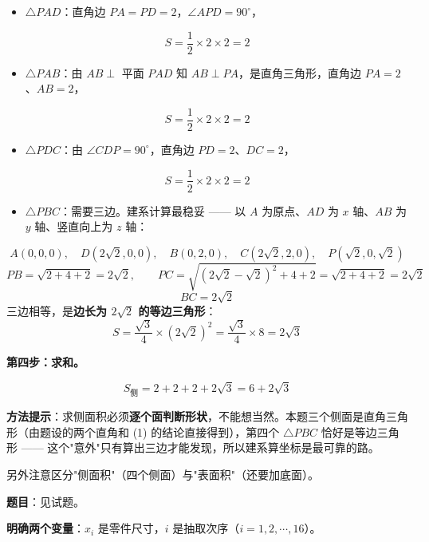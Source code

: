 \begin{itemize}
\item \textbf{$\triangle PAD$}：直角边 $PA=PD=2$，$\angle APD=90^\circ$，
\end{itemize}
\[S=\frac12\times2\times2=2\]
\begin{itemize}
\item \textbf{$\triangle PAB$}：由 $AB\perp$ 平面 $PAD$ 知 $AB\perp PA$，是直角三角形，直角边 $PA=2$、$AB=2$，
\end{itemize}
\[S=\frac12\times2\times2=2\]
\begin{itemize}
\item \textbf{$\triangle PDC$}：由 $\angle CDP=90^\circ$，直角边 $PD=2$、$DC=2$，
\end{itemize}
\[S=\frac12\times2\times2=2\]
\begin{itemize}
\item \textbf{$\triangle PBC$}：需要三边。建系计算最稳妥 —— 以 $A$ 为原点、$AD$ 为 $x$ 轴、$AB$ 为 $y$ 轴、竖直向上为 $z$ 轴：
\end{itemize}
\[A(0,0,0),\quad D\left(2\sqrt2,0,0\right),\quad B(0,2,0),\quad C\left(2\sqrt2,2,0\right),\quad P\left(\sqrt2,0,\sqrt2\right)\]
\[PB=\sqrt{2+4+2}=2\sqrt2,\qquad PC=\sqrt{\left(2\sqrt2-\sqrt2\right)^{2}+4+2}=\sqrt{2+4+2}=2\sqrt2\]
\[BC=2\sqrt2\]
  三边相等，是\textbf{边长为 $2\sqrt2$ 的等边三角形}：
\[S=\frac{\sqrt3}4\times\left(2\sqrt2\right)^{2}=\frac{\sqrt3}4\times8=2\sqrt3\]

\textbf{第四步：求和。}

\[S_{\text{侧}}=2+2+2+2\sqrt3=6+2\sqrt3\]


\begin{gktip}
\textbf{方法提示}：求侧面积必须\textbf{逐个面判断形状}，不能想当然。本题三个侧面是直角三角形（由题设的两个直角和 (1) 的结论直接得到），第四个 $\triangle PBC$ 恰好是等边三角形 —— 这个"意外"只有算出三边才能发现，所以建系算坐标是最可靠的路。

另外注意区分"侧面积"（四个侧面）与"表面积"（还要加底面）。
\end{gktip}

\par\medskip


\textbf{题目}：见试题。


\textbf{明确两个变量}：$x_i$ 是零件尺寸，$i$ 是抽取次序（$i=1,2,\cdots,16$）。


